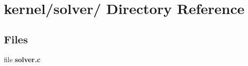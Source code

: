 \hypertarget{dir_000034}{
\section{kernel/solver/ Directory Reference}
\label{dir_000034}
}
\subsection*{Files}
\begin{CompactItemize}
\item 
file {\bf solver.c}
\end{CompactItemize}
